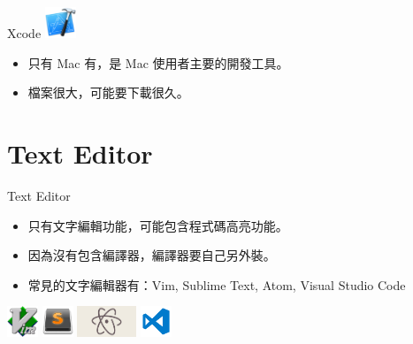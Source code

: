 \documentclass[t]{beamer}
\begin{document}
\begin{frame}{Xcode}
  \vspace{0.5em}
  \hspace{2em}
  \includegraphics[height=2.5em]{image/xcode.png}
  \vspace{0.5em}
  \begin{itemize}
    \item 只有 Mac 有，是 Mac 使用者主要的開發工具。
    \item 檔案很大，可能要下載很久。
  \end{itemize}
\end{frame}

\section{Text Editor}
\begin{frame}{Text Editor}
  \begin{itemize}
    \item 只有文字編輯功能，可能包含程式碼高亮功能。
    \item 因為沒有包含編譯器，編譯器要自己另外裝。
    \item 常見的文字編輯器有：Vim, Sublime Text, Atom, Visual Studio Code
  \end{itemize}
  \begin{center}
    \includegraphics[height=2.5em]{image/vim.png}
    \hspace{1em}
    \includegraphics[height=2.5em]{image/st.png}
    \hspace{1em}
    \includegraphics[height=2.5em]{image/atom.png}
    \hspace{1em}
    \includegraphics[height=2.5em]{image/vscode.png}
  \end{center}
\end{frame}
\end{document}
